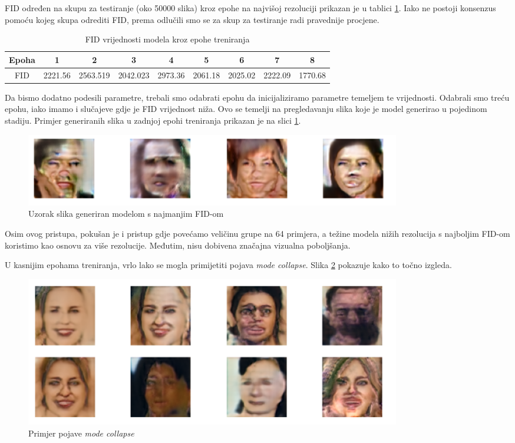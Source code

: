 FID određen na skupu za testiranje (oko 50000 slika) kroz epohe na najvišoj rezoluciji prikazan je u tablici \ref{tablica_fid_16bs}. Iako ne postoji konsenzus pomoću kojeg skupa odrediti FID, prema  odlučili smo se za skup za testiranje radi pravednije procjene.

\begin{table}[h]
\caption{FID vrijednosti modela kroz epohe treniranja}
\begin{center}
\begin{tabular}{ |c|c|c|c|c|c|c|c|c|} 
 \hline
 Epoha & 1 & 2 & 3 & 4 & 5 & 6 & 7 & 8 \\
 \hline
 FID & 2221.56 & 2563.519 & 2042.023 & 2973.36 & 2061.18 & 2025.02 & 2222.09 & 1770.68 \\
 \hline
\end{tabular}
\end{center}
\label{tablica_fid_16bs}
\end{table}

Da bismo dodatno podesili parametre, trebali smo odabrati epohu da inicijaliziramo parametre temeljem te vrijednosti. Odabrali smo treću epohu, iako imamo i slučajeve gdje je FID vrijednost niža. Ovo se temelji na pregledavanju slika koje je model generirao u pojedinom stadiju. Primjer generiranih slika u zadnjoj epohi treniranja prikazan je na slici \ref{generated_lowest_fid}.

\begin{figure}[h]
\centering
		\includegraphics[width=0.8\textwidth]{images/generated/16bs_lowest_fid.png}
\caption{Uzorak slika generiran modelom s najmanjim FID-om}
\label{generated_lowest_fid}
\end{figure}

Osim ovog pristupa, pokušan je i pristup gdje povećamo veličinu grupe na 64 primjera, a težine modela nižih rezolucija s najboljim FID-om koristimo kao osnovu za više rezolucije. Međutim, nisu dobivena značajna vizualna poboljšanja. 

U kasnijim epohama treniranja, vrlo lako se mogla primijetiti pojava \textit{mode collapse}. Slika \ref{mode_collapse} pokazuje kako to točno izgleda. 

\begin{figure}[h]
\centering
		\includegraphics[width=0.8\textwidth]{images/generated/mode_collapse.png}
\caption{Primjer pojave \textit{mode collapse}}
\label{mode_collapse}
\end{figure}

